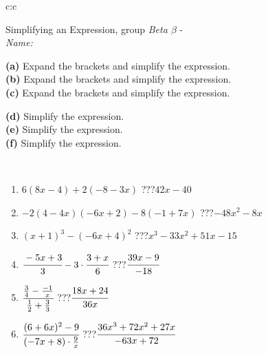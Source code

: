\documentclass[10pt]{report}
\begin{document}
\newpage
\thispagestyle{empty}
\begin{tabular}{c:c}
\begin{minipage}[c][104.5mm][t]{0.5\linewidth}
\begin{center}
\vspace{7mm}
{\huge Simplifying an Expression, group \textit{Beta $\beta$} -}\\[5mm]
\textit{Name:}\phantom{xxxxxxxxxxxxxxxxxxxxxxxxxxxxxxxxxxxxxxxxxxxxxxxxxxxxxxxxxxxxxxxxx}\\[5mm]
\begin{minipage}{0.95\linewidth}
\begin{center}
{\small \begin{minipage}{0.6\textwidth}
\textbf{(a)} Expand the brackets and simplify the expression. \\[1mm]
\textbf{(b)} Expand the brackets and simplify the expression. \\[1mm]
\textbf{(c)} Expand the brackets and simplify the expression.
\end{minipage} \begin{minipage}{0.39\textwidth}
\textbf{(d)} Simplify the expression. \\[1mm]
\textbf{(e)} Simplify the expression. \\[1mm]
\textbf{(f)} Simplify the expression.
\end{minipage}
}
\end{center}
\end{minipage}
\\[4mm]
\begin{minipage}{0.79\linewidth}
\begin{center}
\begin{varwidth}{\linewidth}
\begin{enumerate}
\normalsize
\item $6(8x-4)+2(-8-3x)$\quad \dotfill\; ???\;\dotfill \quad $42x-40$
\item $-2(4-4x)(-6x+2)-8(-1+7x)$\quad \dotfill\; ???\;\dotfill \quad $-48x^2-8x$
\item $(x+1)^3-(-6x+4)^2$\quad \dotfill\; ???\;\dotfill \quad $x^3-33x^2+51x-15$
\item $\cfrac{-5x+3}{3}-3\cdot\cfrac{3+x}{6}$\quad \dotfill\; ???\;\dotfill \quad $\cfrac{39x-9}{-18}$
\item $\cfrac{\frac{3}{4}-\frac{-1}{x}}{\frac{1}{2}+\frac{3}{3}}$\quad \dotfill\; ???\;\dotfill \quad $\cfrac{18x+24}{36x}$
\item $\cfrac{(6+6x)^2-9}{(-7x+8)\cdot\frac{9}{x}}$\quad \dotfill\; ???\;\dotfill \quad $\cfrac{36x^3+72x^2+27x}{-63x+72}$

\end{enumerate}
\end{varwidth}
\end{center}
\end{minipage}
\end{center}
\end{minipage}
\end{tabular}
\end{document}
